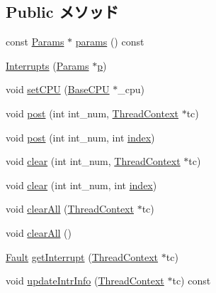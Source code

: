 \subsection*{Public メソッド}
\begin{DoxyCompactItemize}
\item 
const \hyperlink{classMipsISA_1_1Interrupts_a2d2df962f437c169ec932010a88ab884}{Params} $\ast$ \hyperlink{classMipsISA_1_1Interrupts_acd3c3feb78ae7a8f88fe0f110a718dff}{params} () const 
\item 
\hyperlink{classMipsISA_1_1Interrupts_a3d148759405b99148e0c34750966edb1}{Interrupts} (\hyperlink{classMipsISA_1_1Interrupts_a2d2df962f437c169ec932010a88ab884}{Params} $\ast$\hyperlink{namespaceMipsISA_a37d3f683959086eac7bcf24a002a9fb8}{p})
\item 
void \hyperlink{classMipsISA_1_1Interrupts_a2ab8c6aed9969bc58d6aa2427d442cc4}{setCPU} (\hyperlink{classBaseCPU}{BaseCPU} $\ast$\_\-cpu)
\item 
void \hyperlink{classMipsISA_1_1Interrupts_a03cb6c87689ac9000f54a7eacfa2c730}{post} (int int\_\-num, \hyperlink{classThreadContext}{ThreadContext} $\ast$tc)
\item 
void \hyperlink{classMipsISA_1_1Interrupts_a24c6c4fbdc0605bcd015ce06f194e4b4}{post} (int int\_\-num, int \hyperlink{namespaceMipsISA_ae6714ce3c5ef82205cecbd410556edf3}{index})
\item 
void \hyperlink{classMipsISA_1_1Interrupts_a10ed3ba8ce3bd81e1732b0a9a7087a27}{clear} (int int\_\-num, \hyperlink{classThreadContext}{ThreadContext} $\ast$tc)
\item 
void \hyperlink{classMipsISA_1_1Interrupts_af60c3484087379d0330467d77f6cbaae}{clear} (int int\_\-num, int \hyperlink{namespaceMipsISA_ae6714ce3c5ef82205cecbd410556edf3}{index})
\item 
void \hyperlink{classMipsISA_1_1Interrupts_a1ff2f31dc81c8fa68f3d8abb099f3a25}{clearAll} (\hyperlink{classThreadContext}{ThreadContext} $\ast$tc)
\item 
void \hyperlink{classMipsISA_1_1Interrupts_a798729dca95209ecdc609807a653a2bf}{clearAll} ()
\item 
\hyperlink{classRefCountingPtr}{Fault} \hyperlink{classMipsISA_1_1Interrupts_ae603c88d759977611d3bcc6e2deb61ae}{getInterrupt} (\hyperlink{classThreadContext}{ThreadContext} $\ast$tc)
\item 
void \hyperlink{classMipsISA_1_1Interrupts_ad92c743dd73ba955adb1aaa2d9135fb7}{updateIntrInfo} (\hyperlink{classThreadContext}{ThreadContext} $\ast$tc) const 
\item 

\end{DoxyCompactItemize}
